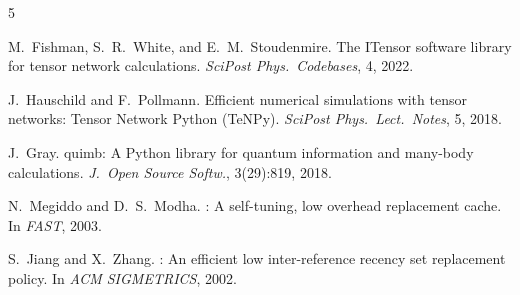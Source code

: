 \documentclass{article}
\begin{document}

\begin{thebibliography}{5}

M.~Fishman, S.~R.~White, and E.~M.~Stoudenmire.
\newblock The {IT}ensor software library for tensor network calculations.
\newblock \emph{SciPost Phys.\ Codebases}, 4, 2022.

J.~Hauschild and F.~Pollmann.
\newblock Efficient numerical simulations with tensor networks: {T}ensor {N}etwork {P}ython ({TeNPy}).
\newblock \emph{SciPost Phys.\ Lect.\ Notes}, 5, 2018.

J.~Gray.
\newblock quimb: A {P}ython library for quantum information and many-body calculations.
\newblock \emph{J.\ Open Source Softw.}, 3(29):819, 2018.

N.~Megiddo and D.~S.~Modha.
: A self-tuning, low overhead replacement cache.
\newblock In \emph{FAST}, 2003.

S.~Jiang and X.~Zhang.
: An efficient low inter-reference recency set replacement policy.
\newblock In \emph{ACM SIGMETRICS}, 2002.

\end{thebibliography}
\end{document}
